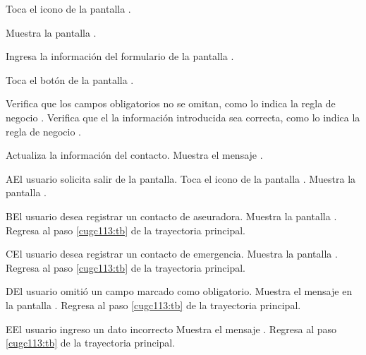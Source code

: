  \begin{UCtrayectoria}
    \UCpaso[\UCactor] Toca el icono \btnGestionar de la pantalla .
    
    \UCpaso[\UCsist]  Muestra la pantalla .
    
    \UCpaso[\UCactor] Ingresa la información del formulario de la pantalla . \label{cugc113:tb} 
    
    \UCpaso[\UCactor] Toca el botón  de la pantalla .   


    \UCpaso[\UCsist] Verifica que los campos obligatorios no se omitan, como lo indica la regla de negocio . 
    \UCpaso[\UCsist] Verifica que el la información introducida sea correcta, como lo indica la regla de negocio . 

    \UCpaso[\UCsist] Actualiza la información del contacto.\label{cugc113:tG}
    \UCpaso[\UCsist] Muestra el mensaje .
 \end{UCtrayectoria}

 \begin{UCtrayectoriaA}{A}{El usuario solicita salir de la pantalla.}
    \UCpaso[\UCactor] Toca el icono \btnRegresar de la pantalla .
	\UCpaso[\UCsist] Muestra la pantalla .
 \end{UCtrayectoriaA}

  \begin{UCtrayectoriaA}{B}{El usuario desea registrar un contacto de aseuradora.}
    \UCpaso[\UCsist] Muestra la pantalla .
    \UCpaso[\UCsist] Regresa al paso \ref{cugc113:tb} de la trayectoria principal.
 \end{UCtrayectoriaA}

  \begin{UCtrayectoriaA}{C}{El usuario desea registrar un contacto de emergencia.}
    \UCpaso[\UCsist] Muestra la pantalla .
    \UCpaso[\UCsist] Regresa al paso \ref{cugc113:tb} de la trayectoria principal.
 \end{UCtrayectoriaA}


 \begin{UCtrayectoriaA}{D}{El usuario omitió un campo marcado como obligatorio.}
 	\UCpaso[\UCsist] Muestra el mensaje  en la pantalla .
	\UCpaso[] Regresa al paso \ref{cugc113:tb} de la trayectoria principal. 
\end{UCtrayectoriaA}

 \begin{UCtrayectoriaA}{E}{El usuario ingreso un dato incorrecto}
	\UCpaso[\UCsist] Muestra el mensaje .
	\UCpaso[] Regresa al paso \ref{cugc113:tb} de la trayectoria principal. 
	
\end{UCtrayectoriaA}



 


 